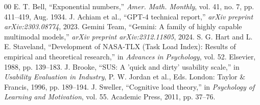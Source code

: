 \documentclass[conference]{IEEEtran}
\begin{document}
\begin{thebibliography}{00}
 E. T. Bell, ``Exponential numbers,'' \textit{Amer. Math. Monthly}, vol. 41, no. 7, pp. 411--419, Aug. 1934.
 J. Achiam et al., ``GPT-4 technical report,'' \textit{arXiv preprint arXiv:2303.08774}, 2023.
 Gemini Team, ``Gemini: A family of highly capable multimodal models,'' \textit{arXiv preprint arXiv:2312.11805}, 2024.
 S. G. Hart and L. E. Staveland, ``Development of NASA-TLX (Task Load Index): Results of empirical and theoretical research,'' in \textit{Advances in Psychology}, vol. 52. Elsevier, 1988, pp. 139--183.
 J. Brooke, ``SUS: A 'quick and dirty' usability scale,'' in \textit{Usability Evaluation in Industry}, P. W. Jordan et al., Eds. London: Taylor \& Francis, 1996, pp. 189--194.
 J. Sweller, ``Cognitive load theory,'' in \textit{Psychology of Learning and Motivation}, vol. 55. Academic Press, 2011, pp. 37--76.
\end{thebibliography}
\end{document}
